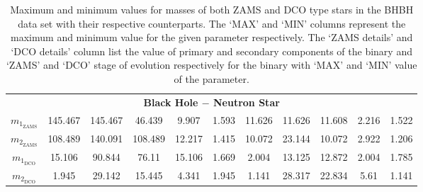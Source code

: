 \documentclass[journal, twocolumn]{IEEEtran}
\newcommand{\mone}[1]{m_{1_{\text{#1}}}}
\newcommand{\mtwo}[1]{m_{2_{\text{#1}}}}
\begin{document}
\begin{table}[!ht]
{\begin{tabular}{@{}ccccccccccc@{}}
				\multicolumn{11}{c}{\textbf{Black Hole $-$ Neutron Star}} \\

				$\mone{ZAMS}$ & 145.467 & 145.467 & 46.439 & 9.907 & 1.593 & 11.626 & 11.626 & 11.608 & 2.216 & 1.522 \\
				$\mtwo{ZAMS}$ & 108.489 & 140.091 & 108.489 & 12.217 & 1.415 & 10.072 & 23.144 & 10.072 & 2.922 & 1.206 \\
				$\mone{DCO}$ & 15.106 & 90.844 & 76.11 & 15.106 & 1.669 & 2.004 & 13.125 & 12.872 & 2.004 & 1.785 \\
				$\mtwo{DCO}$ & 1.945 & 29.142 & 15.445 & 4.341 & 1.945 & 1.141 & 28.317 & 22.834 & 5.61 & 1.141 \\ \bottomrule
			\end{tabular}%
		}
		\caption{Maximum and minimum values for masses of both ZAMS and DCO type stars in the BHBH data set with their respective counterparts. The `MAX' and `MIN' columns represent the maximum and minimum value for the given parameter respectively. The `ZAMS details' and `DCO details' column list the value of primary and secondary components of the binary and `ZAMS' and `DCO' stage of evolution respectively for the binary with `MAX' and `MIN' value of the parameter.}
		\label{tab:bhbh-details-table}
	\end{table}

%
\end{document}

